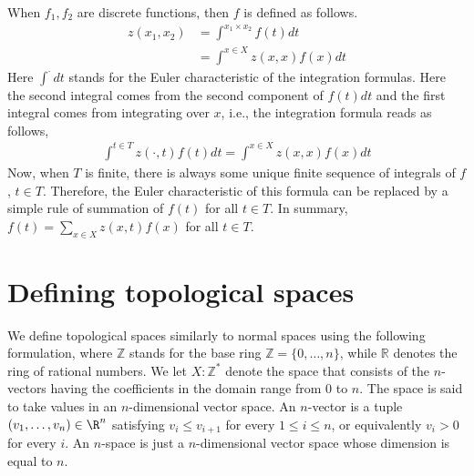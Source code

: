\documentclass[a4paper,reqno,oneside]{article}
\begin{document}
When $f_1,f_2$ are discrete functions, then $f$ is defined as follows. 
\begin{align*}
    z(x_1,x_2)&=\int^{x_1\times x_2}f(t)dt \\
     &=\int^{x\in X} z(x,x) f(x)dt
\end{align*}
Here $\int^{\cdot} dt$ stands for the Euler characteristic of the integration formulas. Here the second integral comes from the second component of $f(t)dt$ and the first integral comes from integrating over $x$, i.e., the integration formula reads as follows, 
\begin{align*}
    \int^{t\in T}z(\cdot,t)f(t)dt= \int^{x\in X}z(x,x)f(x)dt 
\end{align*}
Now, when $T$ is finite, there is always some unique finite sequence of integrals of $f$, $t\in T.$  Therefore, the Euler characteristic of this formula can be replaced by a simple rule of summation of $f(t)$ for all $t\in T.$ In summary, $f(t)=\sum_{x\in X} z(x,t)f(x)$ for all $t\in T.$   




\section{Defining topological spaces} 
We define topological spaces similarly to normal spaces using the following formulation, where $\mathbb{Z}$ stands for the base ring $\mathbb{Z}=\{0,\dots,n\}$, while $\mathbb{R}$ denotes the ring of rational numbers. We let $X:\mathbb{Z}^*$ denote the space that consists of the $n$-vectors having the coefficients in the domain range from $0$ to $n$. The space is said to take values in an $n$-dimensional vector space. An $n$-vector is a tuple $(v_1,\ldots,v_n) \in \R^n$ satisfying $v_i\leq v_{i+1}$ for every $1\leq i\leq n$, or equivalently $v_i>0$ for every $i$.  An $n$-space is just a $n$-dimensional vector space whose dimension is equal to $n$. 
\end{document}
